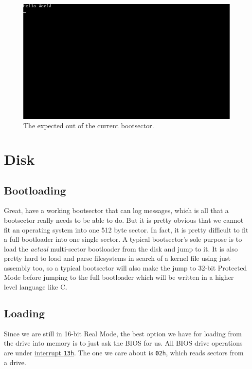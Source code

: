 \documentclass{article}
\begin{document}
\begin{figure}[H]
	\includegraphics[width=\textwidth]{hello_world.png}
	\caption{The expected out of the current bootsector.}
\end{figure}

\section{Disk}

\subsection{Bootloading}

Great, have a working bootsector that can log messages, which is all that a bootsector really needs
to be able to do. But it is pretty obvious that we cannot fit an operating system into one 512 byte
sector. In fact, it is pretty difficult to fit a full bootloader into one single sector. A typical
bootsector's sole purpose is to load the \textit{actual} multi-sector bootloader from the disk and
jump to it. It is also pretty hard to load and parse filesystems in search of a kernel file using
just assembly too, so a typical bootsector will also make the jump to 32-bit Protected Mode before
jumping to the full bootloader which will be written in a higher level language like C.

\subsection{Loading}

Since we are still in 16-bit Real Mode, the best option we have for loading from the drive into
memory is to just ask the BIOS for us. All BIOS drive operations are under
\href{https://en.wikipedia.org/wiki/INT_13H}{interrupt \Verb|13h|}. The one we care about is
\Verb|02h|, which reads sectors from a drive.
\end{document}
